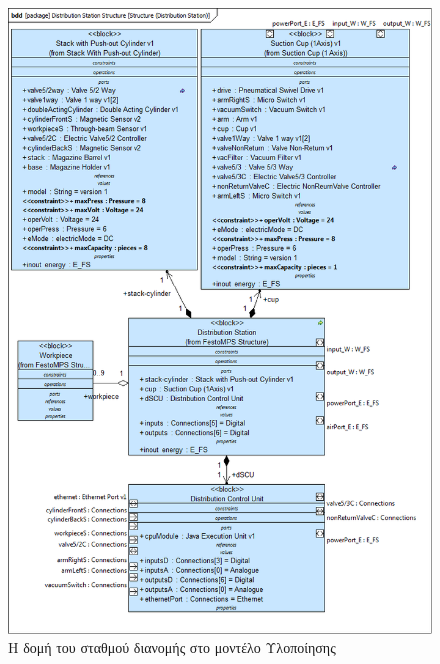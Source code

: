 \documentclass[a4paper,12pt,twoside]{report}
\begin{document}
{\begin{appendices}
				\begin{figure}[hp]
					\centering
					\includegraphics[scale=0.50]{DesignModel_Structure(DistributionStation).png}
					\caption{Η δομή του σταθμού διανομής στο μοντέλο Υλοποίησης}
					\label{φωτ:Η δομή του σταθμού διανομής στο μοντέλο Υλοποίησης}
				\end{figure}
				

\end{appendices}}
\end{document}
